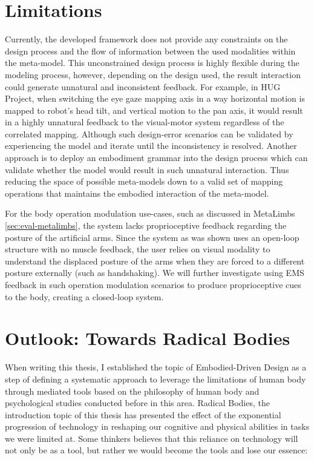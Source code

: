 \section{Limitations}

Currently, the developed framework does not provide any constraints on the design process and the flow of information between the used modalities within the meta-model. This unconstrained design process is highly flexible during the modeling process, however, depending on the design used, the result interaction could generate unnatural and inconsistent feedback. For example, in HUG Project, when switching the eye gaze mapping axis in a way horizontal motion is mapped to robot's head tilt, and vertical motion to the pan axis, it would result in a highly unnatural feedback to the visual-motor system regardless of the correlated mapping. Although such design-error scenarios can be validated by experiencing the model and iterate until the inconsistency is resolved. Another approach is to deploy an embodiment grammar into the design process which can validate whether the model would result in such unnatural interaction. Thus reducing the space of possible meta-models down to a valid set of mapping operations that maintains the embodied interaction of the meta-model.

For the body operation modulation use-cases, such as discussed in MetaLimbs \ref{sec:eval-metalimbs}, the system lacks proprioceptive feedback regarding the posture of the artificial arms. Since the system as was shown uses an open-loop structure with no muscle feedback, the user relies on visual modality to understand the displaced posture of the arms when they are forced to a different posture externally (such as handshaking). We will further investigate using EMS feedback \cite{lopes2015proprioceptive} in such operation modulation scenarios to produce proprioceptive cues to the body, creating a closed-loop system.


\section[Outlook]{Outlook: Towards Radical Bodies}

When writing this thesis, I established the topic of Embodied-Driven Design as a step of defining a systematic approach to leverage the limitations of human body through mediated tools based on the philosophy of human body and psychological studies conducted before in this area. Radical Bodies, the introduction topic of this thesis has presented the effect of the exponential progression of technology in reshaping our cognitive and physical abilities in tasks we were limited at. Some thinkers believes that this reliance on technology will not only be as a tool, but rather we would become the tools and lose our essence:

